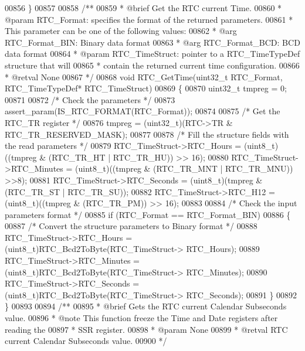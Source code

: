 \begin{DoxyCode}
00856 \}
00857 
00858 \textcolor{comment}{/**}
00859 \textcolor{comment}{  * @brief  Get the RTC current Time.}
00860 \textcolor{comment}{  * @param  RTC\_Format: specifies the format of the returned parameters.}
00861 \textcolor{comment}{  *          This parameter can be  one of the following values:}
00862 \textcolor{comment}{  *            @arg RTC\_Format\_BIN:  Binary data format }
00863 \textcolor{comment}{  *            @arg RTC\_Format\_BCD:  BCD data format}
00864 \textcolor{comment}{  * @param  RTC\_TimeStruct: pointer to a RTC\_TimeTypeDef structure that will }
00865 \textcolor{comment}{  *                        contain the returned current time configuration.     }
00866 \textcolor{comment}{  * @retval None}
00867 \textcolor{comment}{  */}
00868 \textcolor{keywordtype}{void} RTC_GetTime(uint32\_t RTC\_Format, RTC\_TimeTypeDef* RTC\_TimeStruct)
00869 \{
00870   uint32\_t tmpreg = 0;
00871 
00872   \textcolor{comment}{/* Check the parameters */}
00873   assert_param(IS\_RTC\_FORMAT(RTC\_Format));
00874 
00875   \textcolor{comment}{/* Get the RTC\_TR register */}
00876   tmpreg = (uint32\_t)(RTC->TR & RTC_TR_RESERVED_MASK);
00877 
00878   \textcolor{comment}{/* Fill the structure fields with the read parameters */}
00879   RTC\_TimeStruct->RTC_Hours = (uint8\_t)((tmpreg & (RTC_TR_HT | RTC_TR_HU)) >> 16);
00880   RTC\_TimeStruct->RTC_Minutes = (uint8\_t)((tmpreg & (RTC_TR_MNT | 
      RTC_TR_MNU)) >>8);
00881   RTC\_TimeStruct->RTC_Seconds = (uint8\_t)(tmpreg & (RTC_TR_ST | RTC_TR_SU));
00882   RTC\_TimeStruct->RTC_H12 = (uint8\_t)((tmpreg & (RTC_TR_PM)) >> 16);
00883 
00884   \textcolor{comment}{/* Check the input parameters format */}
00885   \textcolor{keywordflow}{if} (RTC\_Format == RTC_Format_BIN)
00886   \{
00887     \textcolor{comment}{/* Convert the structure parameters to Binary format */}
00888     RTC\_TimeStruct->RTC_Hours = (uint8\_t)RTC_Bcd2ToByte(RTC\_TimeStruct->
      RTC_Hours);
00889     RTC\_TimeStruct->RTC_Minutes = (uint8\_t)RTC_Bcd2ToByte(RTC\_TimeStruct->
      RTC_Minutes);
00890     RTC\_TimeStruct->RTC_Seconds = (uint8\_t)RTC_Bcd2ToByte(RTC\_TimeStruct->
      RTC_Seconds);
00891   \}
00892 \}
00893 
00894 \textcolor{comment}{/**}
00895 \textcolor{comment}{  * @brief  Gets the RTC current Calendar Subseconds value.}
00896 \textcolor{comment}{  * @note   This function freeze the Time and Date registers after reading the }
00897 \textcolor{comment}{  *         SSR register.}
00898 \textcolor{comment}{  * @param  None}
00899 \textcolor{comment}{  * @retval RTC current Calendar Subseconds value.}
00900 \textcolor{comment}{  */}

\end{DoxyCode}
